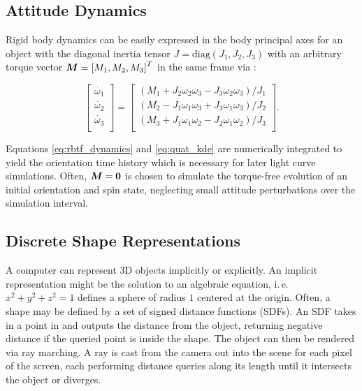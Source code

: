 \subsection{Attitude Dynamics}

Rigid body dynamics can be easily expressed in the body principal axes for an object with the diagonal inertia tensor $J = \mathrm{diag}\left( J_1, J_2, J_3 \right)$ with an arbitrary torque vector $\bm{M} = \left[M_1, M_2, M_3\right]^T$ in the same frame via \cite{crassidis1ed}:

\begin{equation} \label{eq:rbtf_dynamics}
    \left[\begin{matrix}\dot{\omega_1}\\\dot{\omega_2}\\\dot{\omega_3}\\\end{matrix}\right]
    =
    \left[\begin{matrix}
        \left(M_1+J_2\omega_2\omega_3-J_3\omega_2\omega_3\right) / J_1 \\
        \left(M_2-J_1\omega_1\omega_3+J_3\omega_1\omega_3\right) / J_2 \\
        \left(M_3+J_1\omega_1\omega_2-J_2\omega_1\omega_2\right) / J_3 \\
    \end{matrix}\right].
\end{equation}

Equations \ref{eq:rbtf_dynamics} and \ref{eq:quat_kde} are numerically integrated to yield the orientation time history which is necessary for later light curve simulations. Often, $\bm{M} = \mathbf{0}$ is chosen to simulate the torque-free evolution of an initial orientation and spin state, neglecting small attitude perturbations over the simulation interval.

\subsection{Discrete Shape Representations}

A computer can represent 3D objects implicitly or explicitly. An implicit representation might be the solution to an algebraic equation, i.\,e.\, $x^2 + y^2 + z^2 = 1$ defines a sphere of radius $1$ centered at the origin. Often, a shape may be defined by a set of signed distance functions (SDFs). An SDF takes in a point in \rthree and outputs the distance from the object, returning negative distance if the queried point is inside the shape. The object can then be rendered via ray marching. A ray is cast from the camera out into the scene for each pixel of the screen, each performing distance queries along its length until it intersects the object or diverges. 

